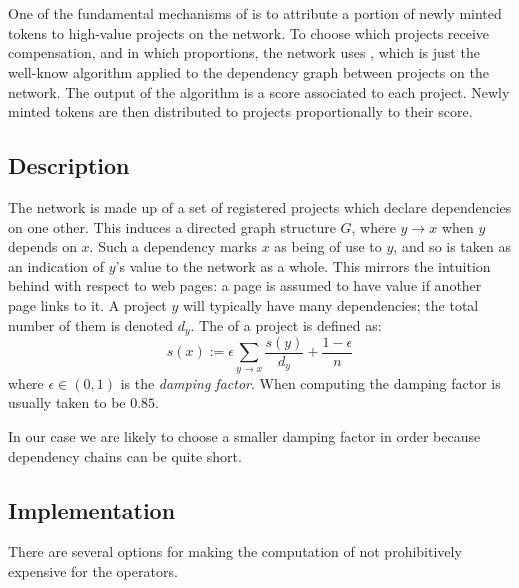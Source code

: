 \section{\srcrank{}}

One of the fundamental mechanisms of \oscoin{} is to attribute a
portion of newly minted tokens to high-value projects on the
network. To choose which projects receive compensation, and in which
proportions, the network uses \srcrank{}, which is just the well-know
\pagerank{} algorithm \cite{pagerank} applied to the dependency graph
between projects on the network. The output of the algorithm is a
score associated to each project. Newly minted tokens are then
distributed to projects proportionally to their score.

\subsection{Description}

The \oscoin{} network is made up of a set of registered projects which
declare dependencies on one other. This induces a directed graph
structure $G$, where $y \to x$ when $y$ depends on $x$. Such a
dependency marks $x$ as being of use to $y$, and so is taken as an
indication of $y$'s value to the network as a whole. This mirrors the
intuition behind \pagerank{} with respect to web pages: a page is
assumed to have value if another page links to it. A project $y$ will
typically have many dependencies; the total number of them is denoted
$d_y$. The \srcrank{} of a project is defined as:
\[
s(x) := \epsilon \sum_{y \to x} \frac{s(y)}{d_y} + \frac{1 - \epsilon}{n}
\]
where $\epsilon \in (0,1)$ is the \emph{damping factor}. When computing
\pagerank{} the damping factor is usually taken to be $0.85$.

In our case we are likely to choose a smaller damping factor in order
because dependency chains can be quite short.


\subsection{Implementation}

There are several options for making the computation of \srcrank{} not
prohibitively expensive for the operators.

